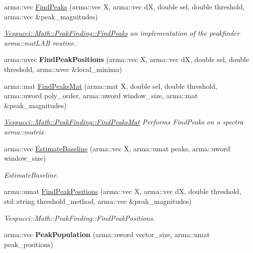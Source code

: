 \begin{DoxyCompactItemize}
\item 
arma\+::vec \hyperlink{namespace_vespucci_1_1_math_1_1_peak_finding_a3d5687d6ba8babb49689af636f28aae8}{Find\+Peaks} (arma\+::vec X, arma\+::vec d\+X, double sel, double threshold, arma\+::vec \&peak\+\_\+magnitudes)
\begin{DoxyCompactList}\small\item\em \hyperlink{namespace_vespucci_1_1_math_1_1_peak_finding_a3d5687d6ba8babb49689af636f28aae8}{Vespucci\+::\+Math\+::\+Peak\+Finding\+::\+Find\+Peaks} an implementation of the peakfinder arma\+::mat\+L\+A\+B routine. \end{DoxyCompactList}\item 
\hypertarget{namespace_vespucci_1_1_math_1_1_peak_finding_a21149205db5d756da8bf91bbc7b71298}{arma\+::uvec {\bfseries Find\+Peak\+Positions} (arma\+::vec X, arma\+::vec d\+X, double sel, double threshold, arma\+::uvec \&local\+\_\+minima)}\label{namespace_vespucci_1_1_math_1_1_peak_finding_a21149205db5d756da8bf91bbc7b71298}

\item 
arma\+::mat \hyperlink{namespace_vespucci_1_1_math_1_1_peak_finding_a9f22a184fb69fb6ab32757fdd19e1ae7}{Find\+Peaks\+Mat} (arma\+::mat X, double sel, double threshold, arma\+::uword poly\+\_\+order, arma\+::uword window\+\_\+size, arma\+::mat \&peak\+\_\+magnitudes)
\begin{DoxyCompactList}\small\item\em \hyperlink{namespace_vespucci_1_1_math_1_1_peak_finding_a9f22a184fb69fb6ab32757fdd19e1ae7}{Vespucci\+::\+Math\+::\+Peak\+Finding\+::\+Find\+Peaks\+Mat} Performs Find\+Peaks on a spectra arma\+::matrix. \end{DoxyCompactList}\item 
arma\+::vec \hyperlink{namespace_vespucci_1_1_math_1_1_peak_finding_a33b834ac6082132d53ec8b307f16e1bd}{Estimate\+Baseline} (arma\+::vec X, arma\+::umat peaks, arma\+::uword window\+\_\+size)
\begin{DoxyCompactList}\small\item\em Estimate\+Baseline. \end{DoxyCompactList}\item 
arma\+::umat \hyperlink{namespace_vespucci_1_1_math_1_1_peak_finding_a502c529617f35fd20d1e11aca2a03a28}{Find\+Peak\+Positions} (arma\+::vec X, arma\+::vec d\+X, double threshold, std\+::string threshold\+\_\+method, arma\+::vec \&peak\+\_\+magnitudes)
\begin{DoxyCompactList}\small\item\em Vespucci\+::\+Math\+::\+Peak\+Finding\+::\+Find\+Peak\+Positions. \end{DoxyCompactList}\item 
\hypertarget{namespace_vespucci_1_1_math_1_1_peak_finding_ab4743c0a36c5000975f1c9f300e101e0}{arma\+::vec {\bfseries Peak\+Population} (arma\+::uword vector\+\_\+size, arma\+::umat peak\+\_\+positions)}\label{namespace_vespucci_1_1_math_1_1_peak_finding_ab4743c0a36c5000975f1c9f300e101e0}


\end{DoxyCompactItemize}
